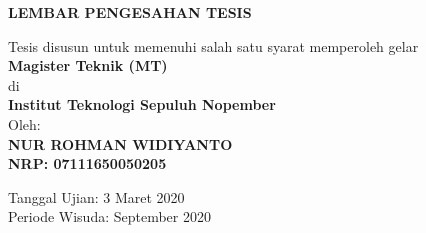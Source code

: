 \AddToShipoutPicture*{\BackgroundIm}

\begin{center}
	\Large\textbf{LEMBAR PENGESAHAN TESIS}
\end{center}

\begin{center}
	Tesis disusun untuk memenuhi salah satu syarat memperoleh gelar\\
	\textbf{Magister Teknik (MT)}\\
	di\\
	\textbf{Institut Teknologi Sepuluh Nopember}\\
	Oleh:\\
	\textbf{NUR ROHMAN WIDIYANTO}\\
	\textbf{NRP: 07111650050205}
\end{center}

\begin{center}
	Tanggal Ujian: 3 Maret 2020\\
	Periode Wisuda: September 2020
\end{center}

